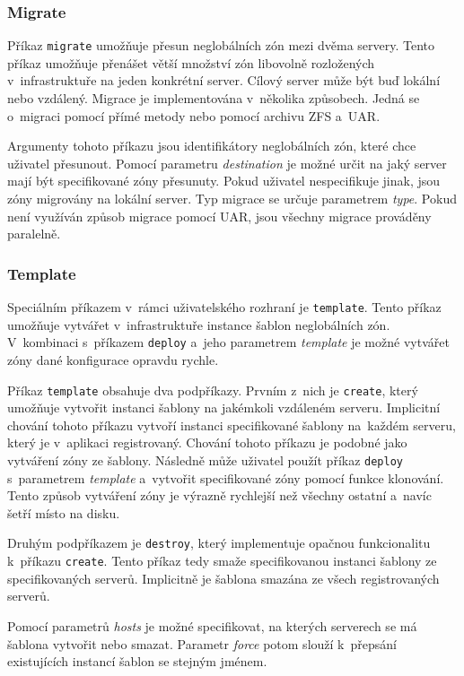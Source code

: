 \subsubsection{Migrate}
\label{chapter:implementation:client:cli:migrate}
Příkaz \verb|migrate| umožňuje přesun neglobálních zón mezi dvěma servery. Tento příkaz umožňuje přenášet větší množství zón
libovolně rozložených v~in\-fra\-struktuře na jeden konkrétní server. Cílový server může být buď lokální nebo vzdálený. Migrace
je implementována v~několika způsobech. Jedná se o~migraci pomocí přímé metody nebo pomocí archivu ZFS a~UAR.

Argumenty tohoto příkazu jsou identifikátory neglobálních zón, které chce uživatel přesunout. Pomocí parametru \textit{destination}
je možné určit na jaký server mají být specifikované zóny přesunuty. Pokud uživatel nespecifikuje jinak, jsou zóny migrovány
na lokální server. Typ migrace se určuje parametrem \textit{type}. Pokud není využíván způsob migrace pomocí UAR, jsou všechny
migrace prováděny paralelně.
\subsubsection{Template}
\label{chapter:implementation:client:cli:template}
Speciálním příkazem v~rámci uživatelského rozhraní je \verb|template|. Tento příkaz umožňuje vytvářet v~infrastruktuře instance
šablon neglobálních zón. V~kombinaci s~příkazem \verb|deploy| a~jeho parametrem \textit{template} je možné vytvářet zóny
dané konfigurace opravdu rychle.

Příkaz \verb|template| obsahuje dva podpříkazy. Prvním z~nich je \verb|create|, který umožňuje vytvořit instanci šablony na 
jakémkoli vzdáleném serveru. Implicitní chování tohoto příkazu vytvoří instanci specifikované šablony na~každém serveru, který
je v~aplikaci registrovaný.
Chování tohoto příkazu je podobné jako vytváření zóny ze šablony. Následně může uživatel použít příkaz \verb|deploy|
s~parametrem \textit{template} a~vytvořit specifikované zóny pomocí funkce klonování. Tento způsob vytváření zóny je výrazně
rychlejší než všechny ostatní a~navíc šetří místo na disku.

Druhým podpříkazem je \verb|destroy|, který implementuje opačnou funkcionalitu k~příkazu \verb|create|. Tento příkaz tedy 
smaže specifikovanou instanci šablony ze specifikovaných serverů. Implicitně je šablona smazána ze všech registrovaných serverů.

Pomocí parametrů \textit{hosts} je možné specifikovat, na kterých serverech se má šablona vytvořit nebo smazat. Parametr
\textit{force} potom slouží k~přepsání existujících instancí šablon se stejným jménem.
